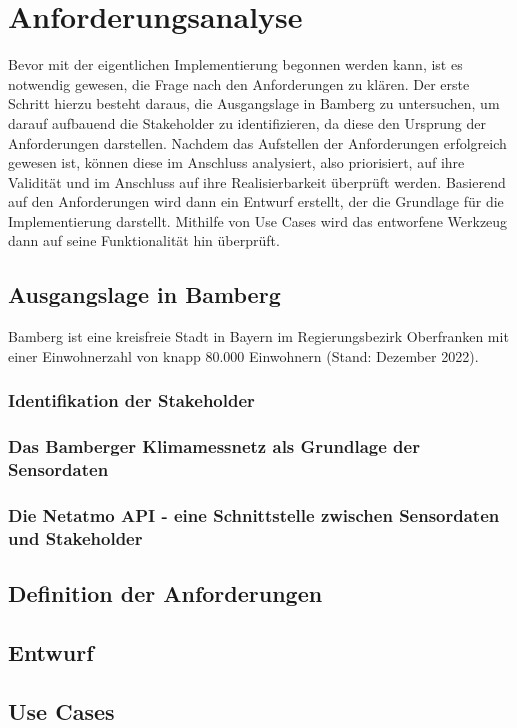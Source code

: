 \chapter{Anforderungsanalyse} %
\label{sec:requirements}
Bevor mit der eigentlichen Implementierung begonnen werden kann, ist es notwendig gewesen, die Frage nach den Anforderungen zu klären. Der erste Schritt 
hierzu besteht daraus, die Ausgangslage in Bamberg zu untersuchen, um darauf aufbauend die Stakeholder zu identifizieren, da diese den Ursprung der Anforderungen 
darstellen. Nachdem das Aufstellen der Anforderungen erfolgreich gewesen ist, können diese im Anschluss analysiert, also priorisiert, auf ihre Validität und im Anschluss 
auf ihre Realisierbarkeit überprüft werden. Basierend auf den Anforderungen wird dann ein Entwurf erstellt, der die Grundlage für die Implementierung darstellt. Mithilfe von 
Use Cases wird das entworfene Werkzeug dann auf seine Funktionalität hin überprüft.

\section{Ausgangslage in Bamberg}
Bamberg ist eine kreisfreie Stadt in Bayern im Regierungsbezirk Oberfranken mit einer Einwohnerzahl von knapp 80.000 Einwohnern 
(Stand: Dezember 2022). %

\subsection{Identifikation der Stakeholder}
\label{sec:stakeholder}

\subsection{Das Bamberger Klimamessnetz als Grundlage der Sensordaten}

\subsection{Die Netatmo API - eine Schnittstelle zwischen Sensordaten und Stakeholder}

\section{Definition der Anforderungen}

\section{Entwurf}

\section{Use Cases}